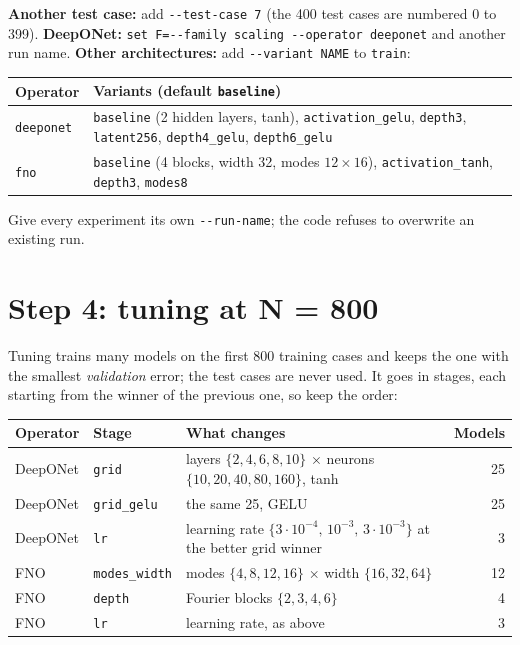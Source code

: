 \documentclass[11pt,a4paper]{article}
\newcommand{\code}[1]{\lstinline{#1}}
\begin{document}
\textbf{Another test case:} add \code{--test-case 7} (the 400 test cases are numbered 0 to 399).
\textbf{DeepONet:} \code{set F=--family scaling --operator deeponet} and another run name.
\textbf{Other architectures:} add \code{--variant NAME} to \code{train}:

\begin{center}
\begin{tabularx}{\textwidth}{@{}lY@{}}
\toprule
Operator & Variants (default \code{baseline}) \\
\midrule
\code{deeponet} & \code{baseline} (2 hidden layers, tanh), \code{activation_gelu}, \code{depth3},
                  \code{latent256}, \code{depth4_gelu}, \code{depth6_gelu} \\
\code{fno}      & \code{baseline} (4 blocks, width 32, modes $12\times16$),
                  \code{activation_tanh}, \code{depth3}, \code{modes8} \\
\bottomrule
\end{tabularx}
\end{center}

Give every experiment its own \code{--run-name}; the code refuses to overwrite an existing run.

\section{Step 4: tuning at N = 800}\label{sec:pctune}

Tuning trains many models on the first 800 training cases and keeps the one with the smallest
\emph{validation} error; the test cases are never used. It goes in stages, each starting from the
winner of the previous one, so keep the order:

\begin{center}
\begin{tabularx}{\textwidth}{@{}llYr@{}}
\toprule
Operator & Stage & What changes & Models \\
\midrule
DeepONet & \code{grid}        & layers $\{2,4,6,8,10\}$ $\times$ neurons $\{10,20,40,80,160\}$, tanh & 25 \\
DeepONet & \code{grid_gelu}   & the same 25, GELU                                              & 25 \\
DeepONet & \code{lr}          & learning rate $\{3\cdot10^{-4},\,10^{-3},\,3\cdot10^{-3}\}$ at the better grid winner & 3 \\
FNO      & \code{modes_width} & modes $\{4,8,12,16\}$ $\times$ width $\{16,32,64\}$              & 12 \\
FNO      & \code{depth}       & Fourier blocks $\{2,3,4,6\}$                                   & 4 \\
FNO      & \code{lr}          & learning rate, as above                                        & 3 \\
\bottomrule
\end{tabularx}
\end{center}
\end{document}
